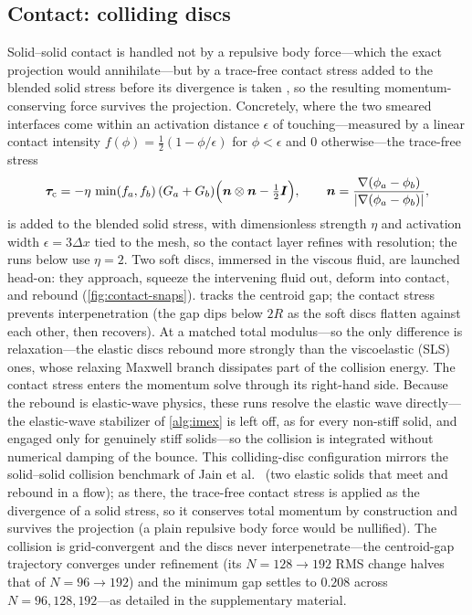 \documentclass[final,3p,times]{elsarticle}
\theoremstyle{remark}
\newcommand{\It}{\bm{I}}                %
\newcommand{\grad}{\nabla}
\newcommand{\dx}{\Delta x}
\begin{document}
\subsection{Contact: colliding discs}
\label{sec:contact}
Solid--solid contact is handled not by a repulsive body force---which the exact projection
would annihilate---but by a trace-free contact stress added to the blended solid stress
before its divergence is taken \cite{Rycroft2020}, so the resulting momentum-conserving force
survives the projection. Concretely, where the two smeared interfaces come within an activation
distance $\epsilon$ of touching---measured by a linear contact intensity
$f(\phi)=\tfrac12(1-\phi/\epsilon)$ for $\phi<\epsilon$ and $0$ otherwise---the trace-free stress
\begin{equation}
\bm\tau_{\rm c}=-\eta\,\min(f_a,f_b)\,(G_a+G_b)\Big(\bm n\otimes\bm n-\tfrac12\It\Big),
\qquad \bm n=\frac{\grad(\phi_a-\phi_b)}{|\grad(\phi_a-\phi_b)|},
\label{eq:contact}
\end{equation}
is added to the blended solid stress, with dimensionless strength $\eta$ and activation width
$\epsilon=3\dx$ tied to the mesh, so the contact layer refines with resolution; the runs below
use $\eta=2$. Two soft discs, immersed in the viscous fluid, are launched head-on:
they approach, squeeze the intervening fluid out, deform into contact, and rebound
(\cref{fig:contact-snaps}).  tracks the centroid gap; the contact stress
prevents interpenetration (the gap dips below $2R$ as the soft discs flatten against each other,
then recovers). At a matched total modulus---so the only difference is relaxation---the elastic
discs rebound more strongly than the viscoelastic (SLS) ones, whose relaxing Maxwell branch
dissipates part of the collision energy. The contact stress enters the momentum solve through its
right-hand side. Because the rebound is elastic-wave physics, these runs resolve the
elastic wave directly---the elastic-wave stabilizer of \cref{alg:imex} is left off, as for every
non-stiff solid, and engaged only for genuinely stiff solids---so the collision is
integrated without numerical damping of the bounce.
This colliding-disc configuration mirrors the solid--solid collision benchmark of Jain et al.\
\cite{Jain2019} (two elastic solids that meet and rebound in a flow); as there, the trace-free
contact stress is applied as the divergence of a solid stress, so it conserves total momentum by
construction and survives the projection (a plain repulsive body force would be nullified). The
collision is grid-convergent and the discs never interpenetrate---the centroid-gap trajectory
converges under refinement (its $N{=}128\!\to\!192$ RMS change halves that of $N{=}96\!\to\!192$)
and the minimum gap settles to $0.208$ across $N=96,128,192$---as detailed in the supplementary
material.
\end{document}
